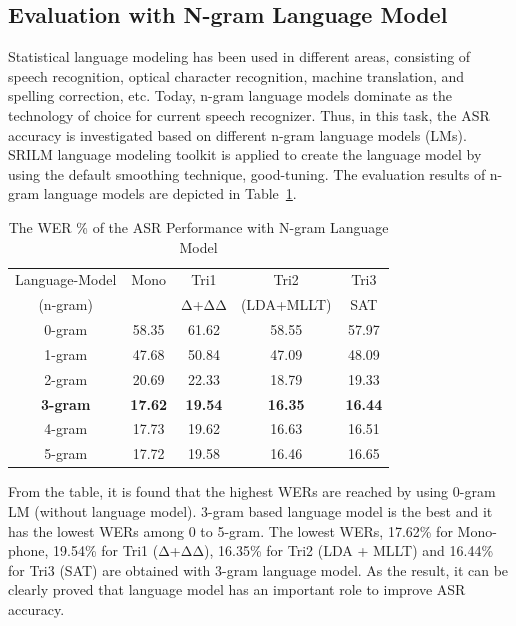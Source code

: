 \documentclass[conference]{IEEEtran}
\begin{document}
\subsection{Evaluation with N-gram Language Model}
\label{sec:EvaluationNGram}
Statistical language modeling has been used in different areas, consisting of speech recognition, optical character recognition, machine translation, and spelling correction, etc. Today, n-gram language models dominate as the technology of choice for current speech recognizer. Thus, in this task, the ASR accuracy is investigated based on different n-gram language models (LMs).  SRILM language modeling toolkit is applied to create the language model by using the default smoothing technique, good-tuning. The evaluation results of n-gram language models are depicted in Table~\ref{table:ngramData}.
\begin{table}[ht]
\caption{The WER \% of the ASR Performance with N-gram Language Model} %
\centering %
\setlength\tabcolsep{1.5pt} %
\begin{tabular}{c c c c c} %
\hline %
Language-Model & Mono & Tri1 & Tri2 & Tri3 \\  %
(n-gram)  &  & Δ+ΔΔ & (LDA+MLLT) & SAT  \\
\hline %
0-gram &  58.35 & 61.62 & 58.55 & 57.97\\
1-gram &  47.68 & 50.84 & 47.09 & 48.09\\
2-gram &  20.69 & 22.33 & 18.79 & 19.33\\
\textbf{3-gram} &  \textbf{17.62}  & \textbf{19.54} & \textbf{16.35} & \textbf{16.44}\\
4-gram &  17.73 & 19.62 & 16.63 & 16.51\\
5-gram &  17.72 & 19.58 & 16.46 & 16.65\\[1ex] %
\hline %
\end{tabular}
\label{table:ngramData} %
\end{table}
From the table, it is found that the highest WERs are reached by using 0-gram LM (without language model). 3-gram based language model is the best and it has the lowest WERs among 0 to 5-gram. The lowest WERs, 17.62\% for Mono-phone, 19.54\% for Tri1 (Δ+ΔΔ), 16.35\% for Tri2 (LDA + MLLT) and 16.44\% for Tri3 (SAT) are obtained with 3-gram language model. As the result, it can be clearly proved that language model has an important role to improve ASR accuracy.
\end{document}
